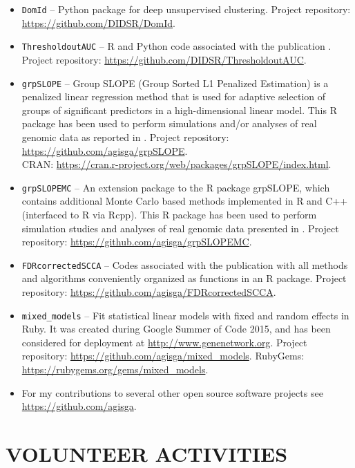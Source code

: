\documentclass[overlapped, line, 10pt]{res} %
\begin{document}
\begin{resume}
\begin{itemize}
  \item \verb!DomId! -- Python package for deep unsupervised clustering. Project repository: \url{https://github.com/DIDSR/DomId}.
  \item \verb!ThresholdoutAUC! -- R and Python code associated with the publication \cite{Gossmann2021-bp}. Project repository: \url{https://github.com/DIDSR/ThresholdoutAUC}.
  \item \verb!grpSLOPE! -- Group SLOPE (Group Sorted L1 Penalized Estimation) is a penalized linear regression method that is used for adaptive selection of groups of significant predictors in a high-dimensional linear model. This R package has been used to perform simulations and/or analyses of real genomic data as reported in \cite{Gossmann2017-yu, brzyski2016}. Project repository: \url{https://github.com/agisga/grpSLOPE}.\\
    CRAN: \url{https://cran.r-project.org/web/packages/grpSLOPE/index.html}.
  \item \verb!grpSLOPEMC! -- An extension package to the R package grpSLOPE, which contains additional Monte Carlo based methods implemented in R and C++ (interfaced to R via Rcpp). This R package has been used to perform simulation studies and analyses of real genomic data presented in \cite{Gossmann2017-yu}. Project repository: \url{https://github.com/agisga/grpSLOPEMC}.
  \item \verb!FDRcorrectedSCCA! -- Codes associated with the publication \cite{Gossmann2017-ln} with all methods and algorithms conveniently organized as functions in an R package. Project repository: \url{https://github.com/agisga/FDRcorrectedSCCA}.
  \item \verb!mixed_models! -- Fit statistical linear models with fixed and random effects in Ruby. It was created during Google Summer of Code 2015, and has been considered for deployment at \url{http://www.genenetwork.org}. Project repository: \url{https://github.com/agisga/mixed_models}. RubyGems: \url{https://rubygems.org/gems/mixed_models}.
  \item For my contributions to several other open source software projects see \url{https://github.com/agisga}.
\end{itemize}


\section{VOLUNTEER ACTIVITIES}


\end{resume}
\end{document}
